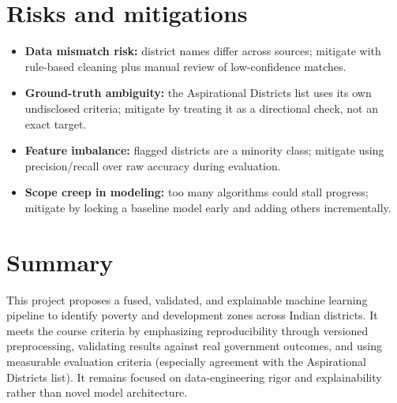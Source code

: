 \documentclass[11pt,a4paper]{article}
\begin{document}
\section{Risks and mitigations}
\begin{itemize}[leftmargin=0.7cm]
    \item \textbf{Data mismatch risk:} district names differ across sources; mitigate with rule-based cleaning plus manual review of low-confidence matches.
    \item \textbf{Ground-truth ambiguity:} the Aspirational Districts list uses its own undisclosed criteria; mitigate by treating it as a directional check, not an exact target.
    \item \textbf{Feature imbalance:} flagged districts are a minority class; mitigate using precision/recall over raw accuracy during evaluation.
    \item \textbf{Scope creep in modeling:} too many algorithms could stall progress; mitigate by locking a baseline model early and adding others incrementally.
\end{itemize}

\section{Summary}
This project proposes a fused, validated, and explainable machine learning pipeline to identify poverty and development zones across Indian districts. It meets the course criteria by emphasizing reproducibility through versioned preprocessing, validating results against real government outcomes, and using measurable evaluation criteria (especially agreement with the Aspirational Districts list). It remains focused on data-engineering rigor and explainability rather than novel model architecture.
\end{document}
